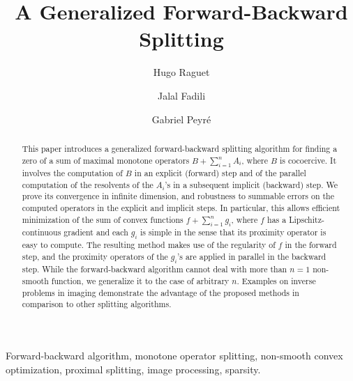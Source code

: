 \documentclass[final]{siamltex}
\title{A Generalized Forward-Backward Splitting}
\author{Hugo Raguet\footnotemark[1]
\and
Jalal Fadili\footnotemark[2]
\and
Gabriel Peyr\'e\footnotemark[1]}
\begin{document}
\maketitle


\begin{abstract}
This paper introduces a generalized forward-backward splitting algorithm for finding a zero of a sum of maximal monotone operators $B + \sum_{i=1}^{n} A_i$, where $B$ is cocoercive. It involves the computation of $B$ in an explicit (forward) step and of the parallel computation of the resolvents of the $A_i$'s in a subsequent implicit (backward) step. We prove its convergence in infinite dimension, and robustness to summable errors on the computed operators in the explicit and implicit steps. 
In particular, this allows efficient minimization of the sum of convex functions $f + \sum_{i=1}^n g_i$, where $f$ has a Lipschitz-continuous gradient and each $g_i$ is simple in the sense that its proximity operator is easy to compute. The resulting method makes use of the regularity of $f$ in the forward step, and the proximity operators of the $g_i$'s are applied in parallel in the backward step.
While the forward-backward algorithm cannot deal with more than $n = 1$ non-smooth function, we generalize it to the case of arbitrary $n$. Examples on inverse problems in imaging demonstrate the advantage of the proposed methods in comparison to other splitting algorithms.
\end{abstract}

\begin{keywords}
	 Forward-backward algorithm, monotone operator splitting, non-smooth convex optimization, proximal splitting, image processing, sparsity.
\end{keywords}

\begin{AMS}\end{AMS}

\renewcommand{\thefootnote}{\arabic{footnote}}
\setcounter{footnote}{0}

\pagestyle{myheadings}
\thispagestyle{plain}

\newcommand{\siam}{~} %




\end{document}
